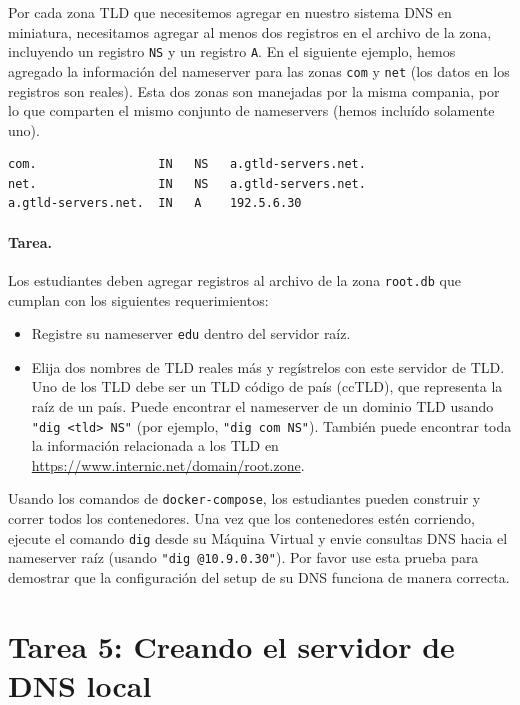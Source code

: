 Por cada zona TLD que necesitemos agregar en nuestro sistema DNS en miniatura, necesitamos agregar al menos dos registros en el archivo de la zona, incluyendo un registro \texttt{NS} y un registro \texttt{A}. En el siguiente ejemplo, hemos agregado la información del nameserver para las zonas \texttt{com} y \texttt{net} (los datos en los registros son reales).
Esta dos zonas son manejadas por la misma compania, por lo que comparten el mismo conjunto de nameservers (hemos incluído solamente uno).

\begin{lstlisting}
com.                 IN   NS   a.gtld-servers.net.
net.                 IN   NS   a.gtld-servers.net.
a.gtld-servers.net.  IN   A    192.5.6.30
\end{lstlisting}
 

\paragraph{Tarea.} Los estudiantes deben agregar registros al archivo de la zona \texttt{root.db} que cumplan con los siguientes requerimientos:


\begin{itemize}[nosep]

\item Registre su nameserver \texttt{edu} dentro del servidor raíz.

\item Elija dos nombres de TLD reales más y regístrelos con este servidor de TLD. Uno de los TLD debe ser un TLD código de país (ccTLD), que representa la raíz de un país. Puede encontrar el nameserver de un dominio TLD usando \texttt{"dig <tld> NS"} (por ejemplo, \texttt{"dig com NS"}).
También puede encontrar toda la información relacionada a los TLD en \url{https://www.internic.net/domain/root.zone}.
\end{itemize}
 
Usando los comandos de \texttt{docker-compose}, los estudiantes pueden construir y correr todos los contenedores.
Una vez que los contenedores estén corriendo, ejecute el comando \texttt{dig} desde su Máquina Virtual y envie consultas DNS hacia el nameserver raíz (usando \texttt{"dig @10.9.0.30"}). Por favor use esta prueba para demostrar que la configuración del setup de su DNS funciona de manera correcta.


\section{Tarea 5: Creando el servidor de DNS local} 

